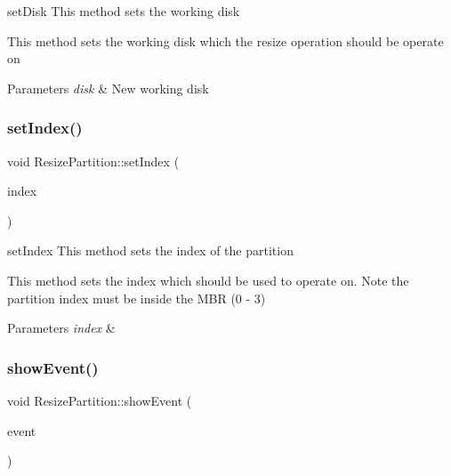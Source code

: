 set\+Disk This method sets the working disk 

This method sets the working disk which the resize operation should be operate on 
\begin{DoxyParams}{Parameters}
{\em disk} & New working disk \\
\hline
\end{DoxyParams}
\mbox{\label{classui_1_1window_1_1_resize_partition_a0c564d96b48c8c9b134e73184a9f591e}} 
\subsubsection{\texorpdfstring{set\+Index()}{setIndex()}}
{\footnotesize\ttfamily void Resize\+Partition\+::set\+Index (\begin{DoxyParamCaption}\item[{int}]{index }\end{DoxyParamCaption})}



set\+Index This method sets the index of the partition 

This method sets the index which should be used to operate on. Note the partition index must be inside the M\+BR (0 -\/ 3) 
\begin{DoxyParams}{Parameters}
{\em index} & \\
\hline
\end{DoxyParams}
\mbox{\label{classui_1_1window_1_1_resize_partition_a3a220945008ce93de147fdf3d8faf486}} 
\subsubsection{\texorpdfstring{show\+Event()}{showEvent()}}
{\footnotesize\ttfamily void Resize\+Partition\+::show\+Event (\begin{DoxyParamCaption}\item[{Q\+Show\+Event $\ast$}]{event }\end{DoxyParamCaption})\hspace{0.3cm}{\ttfamily [override]}}



